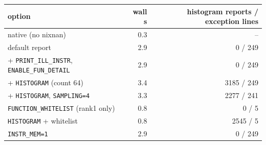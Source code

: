 \begin{tabular}{lrr}
\toprule
option & wall s & histogram reports / exception lines\\
\midrule
native (no nixnan) & 0.3 & --\\
default report & 2.9 & 0 / 249\\
+ \texttt{PRINT\_ILL\_INSTR}, \texttt{ENABLE\_FUN\_DETAIL} & 2.9 & 0 / 249\\
+ \texttt{HISTOGRAM} (count 64) & 3.4 & 3185 / 249\\
+ \texttt{HISTOGRAM}, \texttt{SAMPLING=4} & 3.3 & 2277 / 241\\
\texttt{FUNCTION\_WHITELIST} (rank1 only) & 0.8 & 0 / 5\\
\texttt{HISTOGRAM} + whitelist & 0.8 & 2545 / 5\\
\texttt{INSTR\_MEM=1} & 2.9 & 0 / 249\\
\bottomrule
\end{tabular}

